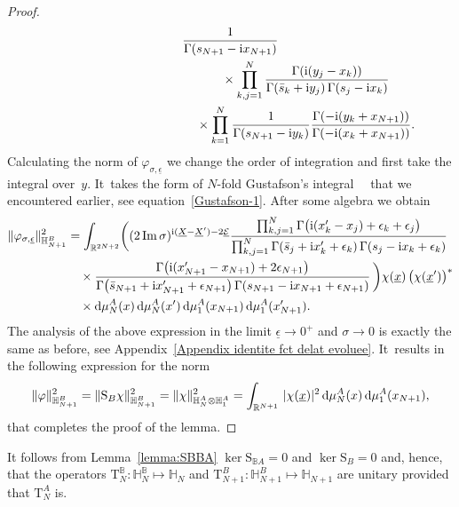 \documentclass[pdftex]{sigma}%
\numberwithin{equation}{section}
\begin{document}
\begin{proof}
\begin{gather*}
\frac1{\Gamma(s_{N+1}-{\rm i}x_{N+1})}
\\ \hphantom{\big(\Psi^N_{p,\underline y},\Phi^N_{{\sigma,x}}\otimes\Phi^1_{\sigma,x_{N+1}}\big)_{\mathbb H_N} =}
{}\times \prod_{k,j=1}^N\frac{\Gamma({\rm i}(y_j-x_k)
)}{\Gamma(\bar s_k+{\rm i}y_j)\,\Gamma(s_j-{\rm i}x_k)}
\\ \hphantom{\big(\Psi^N_{p,\underline y},\Phi^N_{{\sigma,x}}\otimes\Phi^1_{\sigma,x_{N+1}}\big)_{\mathbb H_N} =}
{}\times \prod_{k=1}^N\frac1{\Gamma(s_{N+1}-{\rm i}y_k)} \frac{ \Gamma(-{\rm i}(y_k+x_{N+1}) )}{\Gamma(-{\rm i}(x_k+x_{N+1}))}.
\end{gather*}
Calculating the norm of $\varphi_{\sigma,\underline \epsilon}$ we change the order of integration and first take the integral over~$y$. It~takes the form of $N$-fold Gustafson's integral~~\cite[Theorem 5.1]{MR1139492} that we encountered earlier, see equation~\eqref{Gustafson-1}.
After some algebra we obtain
\begin{align*}
\|\varphi_{\sigma,\underline \epsilon}\|^2_{\mathbb H_{N+1}^B} & = \int_{\mathbb R^{2N+2}}
\biggl((2\mathop{\rm Im}\sigma)^{{\rm i}(\underline X-\underline X')-2\underline{\mathcal E}}
\frac{\prod_{k,j=1}^{N} \Gamma\big({\rm i}(x'_k-x_j)+\epsilon_k+\epsilon_j\big)}{\prod_{k,j=1}^{N}
\Gamma( \bar s_j+{\rm i}x'_k+\epsilon_k)\,\Gamma( s_j-{\rm i}x_k+\epsilon_k)}
\\
&\quad
\times \frac{\Gamma\big({\rm i}(x'_{N+1}-x_{N+1})+2\epsilon_{N+1}\big)}{
\Gamma\big(\bar s_{N+1}+{\rm i}x'_{N+1}+\epsilon_{N+1}\big)\,\Gamma( s_{N+1}-{\rm i}x_{N+1}+\epsilon_{N+1})}\,\biggr)\chi(\underline x)\, \big(\chi(\underline x')\big)^*
\\
&\quad \times {\rm d}\mu_{N}^A(x)\,{\rm d}\mu_{N}^A(x')\, {\rm d}\mu_{1}^A(x_{N+1})\,{\rm d}\mu_{1}^A(x'_{N+1}).
\end{align*}
The analysis of the above expression in the limit $\underline \epsilon\to 0^+$ and $\sigma \to0$ is exactly the same as before, see
Appendix~\ref{Appendix identite fct delat evoluee}. It~results in the following expression for the norm
\begin{gather*}
\|\varphi\|^2_{\mathbb H_{N+1}^B} =\|\mathrm S_B\chi\|^2_{\mathbb H_{N+1}^B} =\|\chi\|^2_{\mathbb H_{N}^A\otimes \mathbb H_1^A}
=\int_{\mathbb R^{N+1}}\, |\chi(\underline x)|^2\,{\rm d}\mu_{N}^A(x)\, {\rm d}\mu_{1}^A(x_{N+1}),
\end{gather*}
that completes the proof of the lemma.
\end{proof}


It follows from Lemma~\ref{lemma:SBBA} $\ker \mathrm S_{\mathbb BA}=0$ and $\ker \mathrm S_B=0$ and, hence, that the operators $\mathrm
T_{N}^{\mathbb B}\colon \mathbb H_{N}^{\mathbb B}\mapsto \mathbb H_{N}$ and $\mathrm T_{N+1}^B\colon \mathbb H_{N+1}^B\mapsto \mathbb H_{N+1}$ are
unitary provided that $\mathrm T_{N}^A$ is.
\end{document}
